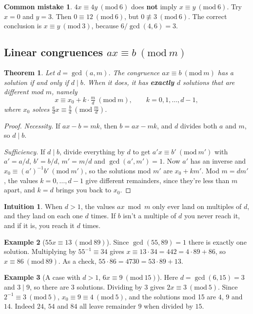 \documentclass[11pt,a4paper]{article}
\newtheorem{theorem}{Theorem}[section]
\theoremstyle{definition}
\newtheorem{example}[theorem]{Example}
\newcommand{\md}[1]{\ (\mathrm{mod}\ #1)}
\theoremstyle{noteit}
\theoremstyle{note}
\newtheorem*{intuition}{Intuition}
\newtheorem*{mistakeX}{Common mistake}
\newenvironment{mistake}{\begin{mistakeX}\leavevmode\marginpar{\raggedleft\vspace*{-0.9\baselineskip}\dbend}\ignorespaces}{\end{mistakeX}}
\begin{document}
\begin{mistake}
$4x\equiv4y\md 6$ does \textbf{not} imply $x\equiv y\md6$. Try $x=0$ and $y=3$. Then $0\equiv12\md 6$, but $0\not\equiv3\md6$. The correct conclusion is $x\equiv y\md 3$, because $6/\gcd(4,6)=3$.
\end{mistake}

\subsection{Linear congruences $ax\equiv b\md m$}

\begin{theorem}
Let $d=\gcd(a,m)$. The congruence $ax\equiv b\md m$ has a solution if and only if $d\mid b$. When it does, it has \textbf{exactly $d$} solutions that are different mod $m$, namely
\[
x\equiv x_0+k\cdot\tfrac{m}{d}\md m,\qquad k=0,1,\dots,d-1,
\]
where $x_0$ solves $\tfrac ad x\equiv\tfrac bd\md{\tfrac md}$.
\end{theorem}
\begin{proof}
\emph{Necessity.} If $ax-b=mk$, then $b=ax-mk$, and $d$ divides both $a$ and $m$, so $d\mid b$.

\emph{Sufficiency.} If $d\mid b$, divide everything by $d$ to get $a'x\equiv b'\md{m'}$ with $a'=a/d$, $b'=b/d$, $m'=m/d$ and $\gcd(a',m')=1$. Now $a'$ has an inverse and $x_0\equiv (a')^{-1}b'\md{m'}$, so the solutions mod $m'$ are $x_0+km'$. Mod $m=dm'$, the values $k=0,\dots,d-1$ give different remainders, since they're less than $m$ apart, and $k=d$ brings you back to $x_0$.
\end{proof}

\begin{intuition}
When $d>1$, the values $ax \bmod m$ only ever land on multiples of $d$, and they land on each one $d$ times. If $b$ isn't a multiple of $d$ you never reach it, and if it is, you reach it $d$ times.
\end{intuition}

\begin{example}[$55x\equiv13\md{89}$]
Since $\gcd(55,89)=1$ there is exactly one solution. Multiplying by $55^{-1}\equiv34$ gives $x\equiv13\cdot34=442=4\cdot89+86$, so $x\equiv86\md{89}$. As a check, $55\cdot86=4730=53\cdot89+13$.
\end{example}

\begin{example}[A case with $d>1$, $6x\equiv9\md{15}$]
Here $d=\gcd(6,15)=3$ and $3\mid9$, so there are 3 solutions. Dividing by 3 gives $2x\equiv3\md5$. Since $2^{-1}\equiv3\md 5$, $x_0\equiv9\equiv4\md5$, and the solutions mod 15 are $4$, $9$ and $14$. Indeed $24$, $54$ and $84$ all leave remainder $9$ when divided by $15$.
\end{example}
\end{document}
